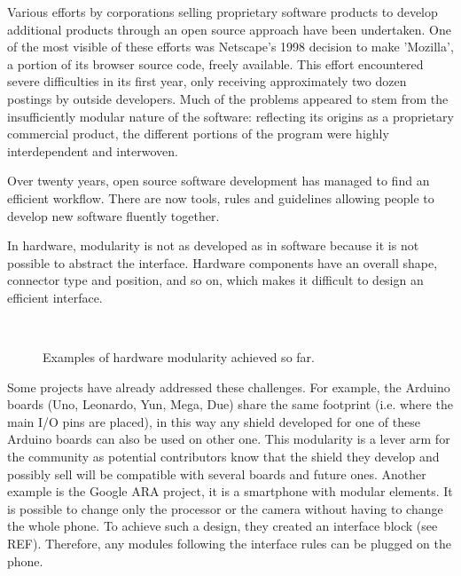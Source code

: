 Various efforts by corporations selling proprietary software products to develop additional products through an open source approach have been undertaken. One of the most visible of these efforts was Netscape's 1998 decision to make 'Mozilla', a portion of its browser source code, freely available. This effort encountered severe difficulties in its first year, only receiving approximately two dozen postings by outside developers. Much of the problems appeared to stem from the insufficiently modular nature of the software: reflecting its origins as a proprietary commercial product, the different portions of the program were highly interdependent and interwoven.

Over twenty years, open source software development has managed to find an efficient workflow. There are now tools, rules and guidelines allowing people to develop new software fluently together.

In hardware, modularity is not as developed as in software because it is not possible to abstract the interface. Hardware components have an overall shape, connector type and position, and so on, which makes it difficult to design an efficient interface.

\begin{figure}[tb]
\centering
    \hfil
     \\
    \caption{Examples of hardware modularity achieved so far.}
    \label{fig:hardware-modularity}
\end{figure}

Some projects have already addressed these challenges. For example, the Arduino boards (Uno, Leonardo, Yun, Mega, Due) share the same footprint (i.e. where the main I/O pins are placed), in this way any shield developed for one of these Arduino boards can also be used on other one. This modularity is a lever arm for the community as potential contributors know that the shield they develop and possibly sell will be compatible with several boards and future ones.
Another example is the Google ARA project, it is a smartphone with modular elements. It is possible to change only the processor or the camera without having to change the whole phone. To achieve such a design, they created an interface block (see REF). Therefore, any modules following the interface rules can be plugged on the phone.



